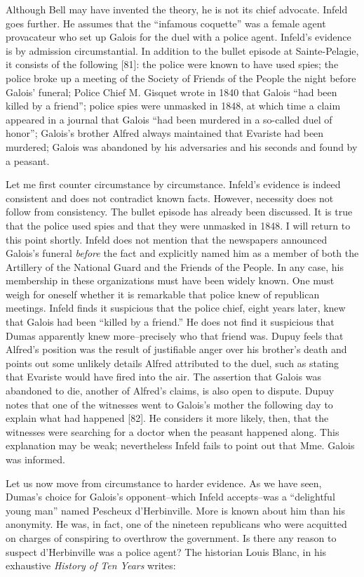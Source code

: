 \documentclass[12pt]{article}
\begin{document}
Although Bell may have invented the theory, he is not its chief advocate. Infeld goes further. He assumes that the ``infamous coquette'' was a female agent provacateur who set up Galois for the duel with a police agent. Infeld's evidence is by admission circumstantial. In addition to the bullet episode at Sainte-Pelagie, it consists of the following [81]: the police were known to have used spies; the police broke up a meeting of the Society of Friends of the People the night before Galois' funeral; Police Chief M. Gisquet wrote in 1840 that Galois ``had been killed by a friend''; police spies were unmasked in 1848, at which time a claim appeared in a journal that Galois ``had been murdered in a so-called duel of honor''; Galois's brother Alfred always maintained that Evariste had been murdered; Galois was abandoned by his adversaries and his seconds and found by a peasant.

Let me first counter circumstance by circumstance. Infeld's evidence is indeed consistent and does not contradict known facts. However, necessity does not follow from consistency. The bullet episode has already been discussed. It is true that the police used spies and that they were unmasked in 1848. I will return to this point shortly. Infeld does not mention that the newspapers announced Galois's funeral {\it before} the fact and explicitly named him as a member of both the Artillery of the National Guard and the Friends of the People. In any case, his membership in these organizations must have been widely known. One must weigh for oneself whether it is remarkable that police knew of republican meetings. Infeld finds it suspicious that the police chief, eight years later, knew that Galois had been ``killed by a friend.'' He does not find it suspicious that Dumas apparently knew more--precisely who that friend was. Dupuy feels that Alfred's position was the result of justifiable anger over his brother's death and points out some unlikely details Alfred attributed to the duel, such as stating that Evariste would have fired into the air. The assertion that Galois was abandoned to die, another of Alfred's claims, is also open to dispute. Dupuy notes that one of the witnesses went to Galois's mother the following day to explain what had happened [82]. He considers it more likely, then, that the witnesses were searching for a doctor when the peasant happened along. This explanation may be weak; nevertheless Infeld fails to point out that Mme. Galois was informed.

Let us now move from circumstance to harder evidence. As we have seen, Dumas's choice for Galois's opponent--which Infeld accepts--was a ``delightful young man'' named Pescheux d'Herbinville. More is known about him than his anonymity. He was, in fact, one of the nineteen republicans who were acquitted on charges of conspiring to overthrow the government. Is there any reason to suspect d'Herbinville was a police agent? The historian Louis Blanc, in his exhaustive \emph{History of Ten Years} writes:
\end{document}
